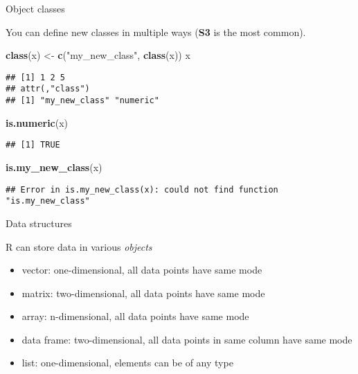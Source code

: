 \documentclass[ignorenonframetext,]{beamer}
\newenvironment{Shaded}{\begin{snugshade}}{\end{snugshade}}
\newcommand{\KeywordTok}[1]{\textcolor[rgb]{0.13,0.29,0.53}{\textbf{#1}}}
\newcommand{\NormalTok}[1]{#1}
\newcommand{\StringTok}[1]{\textcolor[rgb]{0.31,0.60,0.02}{#1}}
\providecommand{\tightlist}{%
  \setlength{\itemsep}{0pt}\setlength{\parskip}{0pt}}
\begin{document}
\begin{frame}[fragile]{Object classes}
\protect\hypertarget{object-classes-2}{}

You can define new classes in multiple ways (\textbf{S3} is the most
common).

\begin{Shaded}
\begin{Highlighting}[]
\KeywordTok{class}\NormalTok{(x) <-}\StringTok{ }\KeywordTok{c}\NormalTok{(}\StringTok{"my_new_class"}\NormalTok{, }\KeywordTok{class}\NormalTok{(x))}
\NormalTok{x}
\end{Highlighting}
\end{Shaded}

\begin{verbatim}
## [1] 1 2 5
## attr(,"class")
## [1] "my_new_class" "numeric"
\end{verbatim}

\begin{Shaded}
\begin{Highlighting}[]
\KeywordTok{is.numeric}\NormalTok{(x)}
\end{Highlighting}
\end{Shaded}

\begin{verbatim}
## [1] TRUE
\end{verbatim}

\begin{Shaded}
\begin{Highlighting}[]
\KeywordTok{is.my_new_class}\NormalTok{(x)}
\end{Highlighting}
\end{Shaded}

\begin{verbatim}
## Error in is.my_new_class(x): could not find function "is.my_new_class"
\end{verbatim}

\end{frame}

\begin{frame}{Data structures}
\protect\hypertarget{data-structures}{}

R can store data in various \emph{objects}

\begin{itemize}
\tightlist
\item
  vector: one-dimensional, all data points have same mode
\item
  matrix: two-dimensional, all data points have same mode
\item
  array: n-dimensional, all data points have same mode
\item
  data frame: two-dimensional, all data points in same column have same
  mode
\item
  list: one-dimensional, elements can be of any type
\end{itemize}

\end{frame}
\end{document}
